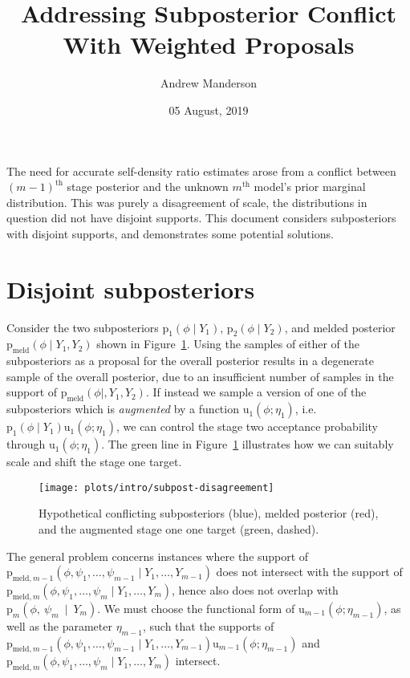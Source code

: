 \documentclass[10pt,a4paper,]{article}
\title{Addressing Subposterior Conflict With Weighted Proposals}
\author{Andrew Manderson}
\date{05 August, 2019}
\newcommand{\pd}{\text{p}}
\newcommand{\pmeld}{\pd_{\text{meld}}}
\newcommand{\tarw}{\text{u}}
\newcommand{\modelindex}{m}
\begin{document}
\maketitle

The need for accurate self-density ratio estimates arose from a conflict
between \((m - 1)^{\text{th}}\) stage posterior and the unknown
\(m^{\text{th}}\) model's prior marginal distribution. This was purely a
disagreement of scale, the distributions in question did not have
disjoint supports. This document considers subposteriors with disjoint
supports, and demonstrates some potential solutions.

\section{Disjoint subposteriors}\label{disjoint-subposteriors}

Consider the two subposteriors \(\pd_{1}(\phi \mid Y_{1})\),
\(\pd_{2}(\phi \mid Y_{2})\), and melded posterior
\(\pmeld(\phi \mid Y_{1}, Y_{2})\) shown in
Figure~\ref{fig:subpost_disagreement}. Using the samples of either of
the subposteriors as a proposal for the overall posterior results in a
degenerate sample of the overall posterior, due to an insufficient
number of samples in the support of \(\pmeld(\phi \mid, Y_{1}, Y_{2})\).
If instead we sample a version of one of the subposteriors which is
\emph{augmented} by a function \(\tarw_{1}(\phi; \eta_{1})\),
i.e.~\(\pd_{1}(\phi \mid Y_{1})\tarw_{1}(\phi; \eta_{1})\), we can
control the stage two acceptance probability through
\(\tarw_{1}(\phi; \eta_{1})\). The green line in
Figure~\ref{fig:subpost_disagreement} illustrates how we can suitably
scale and shift the stage one target.

\begin{figure}

{\centering \texttt{[image: plots/intro/subpost-disagreement]} 

}

\caption{Hypothetical conflicting subposteriors (blue), melded posterior (red), and the augmented stage one one target (green, dashed).}\label{fig:subpost_disagreement}
\end{figure}

The general problem concerns instances where the support of
\(\pd_{\text{meld}, \modelindex - 1}(\phi, \psi_{1}, \ldots, \psi_{\modelindex - 1} \mid Y_{1}, \ldots, Y_{\modelindex - 1})\)
does not intersect with the support of
\(\pd_{\text{meld}, \modelindex}(\phi, \psi_{1}, \ldots, \psi_{\modelindex} \mid Y_{1}, \ldots, Y_{\modelindex})\),
hence also does not overlap with
\(\pd_{\modelindex}(\phi,~\psi_{\modelindex}~\mid~Y_{\modelindex})\). We
must choose the functional form of
\(\tarw_{\modelindex - 1}(\phi; \eta_{\modelindex - 1})\), as well as
the parameter \(\eta_{\modelindex - 1}\), such that the supports of
\(\pd_{\text{meld}, \modelindex - 1}(\phi, \psi_{1}, \ldots, \psi_{\modelindex - 1} \mid Y_{1}, \ldots, Y_{\modelindex - 1})\tarw_{\modelindex - 1}(\phi; \eta_{\modelindex - 1})\)
and
\(\pd_{\text{meld}, \modelindex}(\phi, \psi_{1}, \ldots, \psi_{\modelindex} \mid Y_{1}, \ldots, Y_{\modelindex})\)
intersect.
\end{document}
